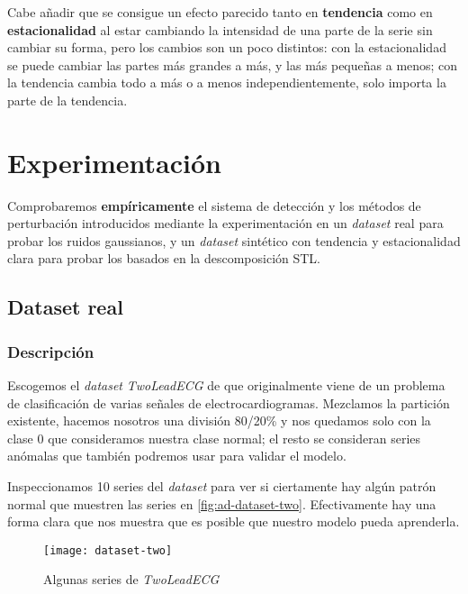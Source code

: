 Cabe añadir que se consigue un efecto parecido tanto en \textbf{tendencia} como en \textbf{estacionalidad} al estar cambiando la intensidad de una parte de la serie sin cambiar su forma, pero los cambios son un poco distintos: con la estacionalidad se puede cambiar las partes más grandes a más, y las más pequeñas a menos; con la tendencia cambia todo a más o a menos independientemente, solo importa la parte de la tendencia.

\chapter{Experimentación}\label{ch:ad-experimentacion}

Comprobaremos \textbf{empíricamente} el sistema de detección y los métodos de perturbación introducidos mediante la experimentación en un \emph{dataset} real para probar los ruidos gaussianos, y un \emph{dataset} sintético con tendencia y estacionalidad clara para probar los basados en la descomposición STL.

\section{Dataset real}

\subsection{Descripción}

Escogemos el \emph{dataset} \emph{TwoLeadECG} de \cite{bagnall2020ts} que originalmente viene de un problema de clasificación de varias señales de electrocardiogramas. Mezclamos la partición existente, hacemos nosotros una división 80/20\% y nos quedamos solo con la clase 0 que consideramos nuestra clase normal; el resto se consideran series anómalas que también podremos usar para validar el modelo.

Inspeccionamos 10 series del \emph{dataset} para ver si ciertamente hay algún patrón normal que muestren las series en \autoref{fig:ad-dataset-two}. Efectivamente hay una forma clara que nos muestra que es posible que nuestro modelo pueda aprenderla.

\begin{figure}[htpb]
  \centering
  \texttt{[image: dataset-two]}
  \caption{Algunas series de \emph{TwoLeadECG}}
  \label{fig:ad-dataset-two}
\end{figure}

